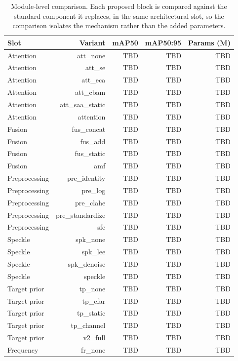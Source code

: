 \begin{table}[t]
\centering
\caption{Module-level comparison. Each proposed block is compared against the standard component it replaces, in the same architectural slot, so the comparison isolates the mechanism rather than the added parameters.}
\label{tab:module_ablation}
\begin{tabular}{lrrrr}
\toprule
Slot & Variant & mAP50 & mAP50:95 & Params (M) \\
\midrule
Attention & att_none & TBD & TBD & TBD \\
Attention & att_se & TBD & TBD & TBD \\
Attention & att_eca & TBD & TBD & TBD \\
Attention & att_cbam & TBD & TBD & TBD \\
Attention & att_saa_static & TBD & TBD & TBD \\
Attention & attention & TBD & TBD & TBD \\
Fusion & fus_concat & TBD & TBD & TBD \\
Fusion & fus_add & TBD & TBD & TBD \\
Fusion & fus_static & TBD & TBD & TBD \\
Fusion & amf & TBD & TBD & TBD \\
Preprocessing & pre_identity & TBD & TBD & TBD \\
Preprocessing & pre_log & TBD & TBD & TBD \\
Preprocessing & pre_clahe & TBD & TBD & TBD \\
Preprocessing & pre_standardize & TBD & TBD & TBD \\
Preprocessing & sfe & TBD & TBD & TBD \\
Speckle & spk_none & TBD & TBD & TBD \\
Speckle & spk_lee & TBD & TBD & TBD \\
Speckle & spk_denoise & TBD & TBD & TBD \\
Speckle & speckle & TBD & TBD & TBD \\
Target prior & tp_none & TBD & TBD & TBD \\
Target prior & tp_cfar & TBD & TBD & TBD \\
Target prior & tp_static & TBD & TBD & TBD \\
Target prior & tp_channel & TBD & TBD & TBD \\
Target prior & v2_full & TBD & TBD & TBD \\
Frequency & fr_none & TBD & TBD & TBD \\

\end{tabular}
\end{table}
